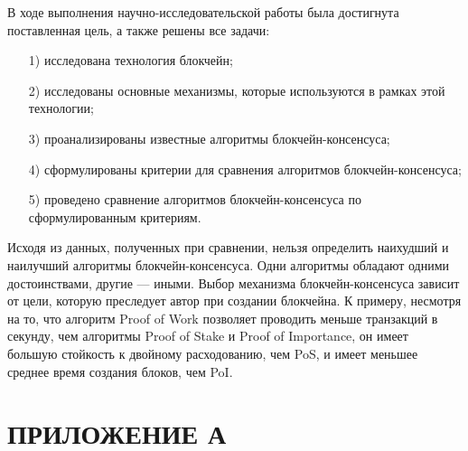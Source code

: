 В ходе выполнения научно-исследовательской работы была достигнута поставленная цель, а также решены все задачи:

\begin{enumerate}
\item[1)]
исследована технология блокчейн;
\item[2)]
исследованы основные механизмы, которые используются в рамках этой технологии;
\item[3)]
проанализированы известные алгоритмы блокчейн-консенсуса;
\item[4)]
сформулированы критерии для сравнения алгоритмов блокчейн-консенсуса;
\item[5)]
проведено сравнение алгоритмов блокчейн-консенсуса по сформулированным критериям.
\end{enumerate}

Исходя из данных, полученных при сравнении, нельзя определить наихудший и наилучший алгоритмы блокчейн-консенсуса. 
Одни алгоритмы обладают одними достоинствами, другие --- иными. 
Выбор механизма блокчейн-консенсуса зависит от цели, которую преследует автор при создании блокчейна. 
К примеру, несмотря на то, что алгоритм Proof of Work позволяет проводить меньше транзакций в секунду, чем алгоритмы Proof of Stake и Proof of Importance, он имеет большую стойкость к двойному расходованию, чем PoS, и имеет меньшее среднее время создания блоков, чем PoI. 

{\centering {\center\printbibliography[title=СПИСОК ИСПОЛЬЗОВАННЫХ ИСТОЧНИКОВ]}}

{\centering \chapter*{ПРИЛОЖЕНИЕ А}}


